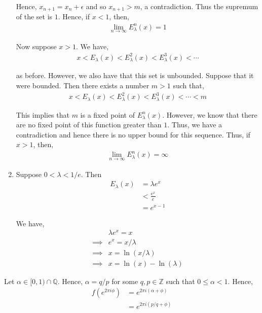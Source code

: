\documentclass[12pt]{article}
\newenvironment{problem}[2][Problem]{\begin{trivlist}
\item[\hskip \labelsep {\bfseries #1}\hskip \labelsep {\bfseries #2.}]}{\end{trivlist}}
\begin{document}
\begin{enumerate}[label=(\alph*)]
Hence, $x_{n+1} = x_n + \epsilon$ and so $x_{n+1} > m$, a contradiction. Thus the supremum of the set is $1$. Hence, if $x < 1$, then,
\begin{align*}
\lim_{n \to \infty} E_{\lambda}^n(x) = 1
\end{align*}

Now suppose $x > 1$. We have,
\begin{align*}
x < E_{\lambda}(x) < E_{\lambda}^2(x) < E_{\lambda}^3(x) < \cdots
\end{align*}

as before. However, we also have that this set is unbounded. Suppose that it were bounded. Then there exists a number $m > 1$ such that,
\begin{align*}
x < E_{\lambda}(x) < E_{\lambda}^2(x) < E_{\lambda}^3(x) < \cdots < m
\end{align*}

This implies that $m$ is a fixed point of $E_{\lambda}^n(x)$. However, we know that there are no fixed point of this function greater than $1$. Thus, we have a contradiction and hence there is no upper bound for this sequence. Thus, if $x > 1$, then,
\begin{align*}
\lim_{n \to \infty} E_{\lambda}^n(x) = \infty
\end{align*}


\item Suppose $0 < \lambda < 1/e$. Then
\begin{align*}
E_{\lambda}(x) &= \lambda e^x\\
&< \frac{e^x}{e}\\
&= e^{x-1}
\end{align*}

We have,
\begin{align*}
&\lambda e^x = x\\
\implies &e^x = x/\lambda\\
\implies &x = \ln(x/\lambda)\\
\implies &x = \ln(x) - \ln(\lambda)
\end{align*}
\end{enumerate}

\begin{problem}{3}
\end{problem}

Let $\alpha \in [0, 1) \cap \mathbb{Q}$. Hence, $\alpha = q/p$ for some $q, p \in \mathbb{Z}$ such that $0 \leq \alpha < 1$. Hence,
\begin{align*}
f(e^{2\pi i \phi}) &= e^{2\pi i (\alpha + \phi)}\\
&= e^{2\pi i (p/q + \phi)}
\end{align*}
\end{document}
